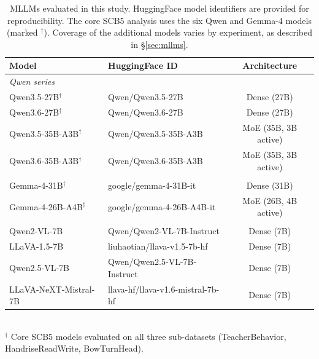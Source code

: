 \documentclass[11pt,a4paper]{article}
\begin{document}
\begin{table}[t]
\caption{MLLMs evaluated in this study. HuggingFace model identifiers are provided for reproducibility. The core SCB5 analysis uses the six Qwen and Gemma-4 models (marked $^\dagger$). Coverage of the additional models varies by experiment, as described in \S\ref{sec:mllms}.}
\label{tab:mllms}
\centering
\footnotesize
\setlength{\tabcolsep}{2.5pt}
\begin{tabular}{llc}
\toprule
\textbf{Model} & \textbf{HuggingFace ID} & \textbf{Architecture} \\
\midrule
\multicolumn{3}{l}{\textit{Qwen series}} \\
Qwen3.5-27B$^\dagger$ & Qwen/Qwen3.5-27B & Dense (27B) \\
Qwen3.6-27B$^\dagger$ & Qwen/Qwen3.6-27B & Dense (27B) \\
Qwen3.5-35B-A3B$^\dagger$ & Qwen/Qwen3.5-35B-A3B & MoE (35B, 3B active) \\
Qwen3.6-35B-A3B$^\dagger$ & Qwen/Qwen3.6-35B-A3B & MoE (35B, 3B active) \\
\addlinespace
\multicolumn{3}{l}{\textit{Google Gemma series}} \\
Gemma-4-31B$^\dagger$ & google/gemma-4-31B-it & Dense (31B) \\
Gemma-4-26B-A4B$^\dagger$ & google/gemma-4-26B-A4B-it & MoE (26B, 4B active) \\
\addlinespace
\multicolumn{3}{l}{\textit{Additional MLLMs}} \\
Qwen2-VL-7B & Qwen/Qwen2-VL-7B-Instruct & Dense (7B) \\
LLaVA-1.5-7B & liuhaotian/llava-v1.5-7b-hf & Dense (7B) \\
Qwen2.5-VL-7B & Qwen/Qwen2.5-VL-7B-Instruct & Dense (7B) \\
LLaVA-NeXT-Mistral-7B & llava-hf/llava-v1.6-mistral-7b-hf & Dense (7B) \\
\bottomrule
\end{tabular}
\\[2pt]
\footnotesize{$^\dagger$ Core SCB5 models evaluated on all three sub-datasets (TeacherBehavior, HandriseReadWrite, BowTurnHead).}
\end{table}
\end{document}
